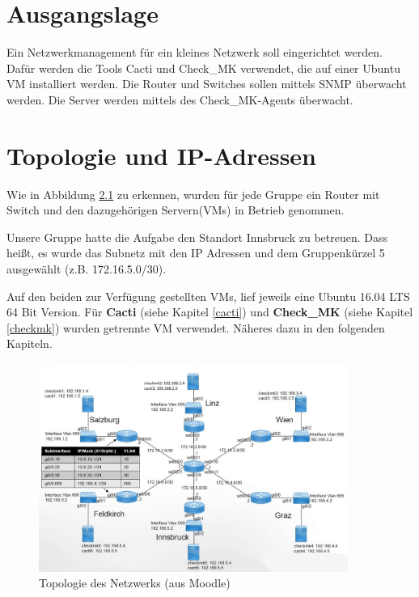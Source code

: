 \thispagestyle{standard}
\pagestyle{standard}
\chapter{Ausgangslage}
\label{ausgangs}

Ein Netzwerkmanagement für ein kleines Netzwerk soll eingerichtet werden. Dafür werden die Tools Cacti und Check\_MK verwendet, die auf einer Ubuntu \ac{VM} installiert werden. Die Router und Switches sollen mittels \ac{SNMP} überwacht werden. Die Server werden mittels des Check\_MK-Agents überwacht.

\chapter{Topologie und IP-Adressen}
\label{topo}


Wie in Abbildung \ref{img:topologie} zu erkennen, wurden für jede Gruppe ein Router mit Switch und den dazugehörigen Servern(\ac{VM}s) in Betrieb genommen.

Unsere Gruppe hatte die Aufgabe den Standort Innsbruck zu betreuen. Dass hei{\ss}t, es wurde das Subnetz mit den \ac{IP} Adressen und dem Gruppenkürzel 5 ausgewählt (z.B. 172.16.5.0/30).


Auf den beiden zur Verfügung gestellten \ac{VM}s, lief jeweils eine Ubuntu 16.04 LTS 64 Bit Version. Für \textbf{Cacti} (siehe Kapitel \ref{cacti}) und \textbf{Check\_MK} (siehe Kapitel \ref{checkmk}) wurden getrennte \ac{VM} verwendet. Näheres dazu in den folgenden Kapiteln.


\begin{figure}[H]
	\centering
	\includegraphics[width=0.9\textwidth]{img/Topologie.JPG}
	\caption{Topologie des Netzwerks (aus Moodle)}
	\label{img:topologie}
\end{figure}

